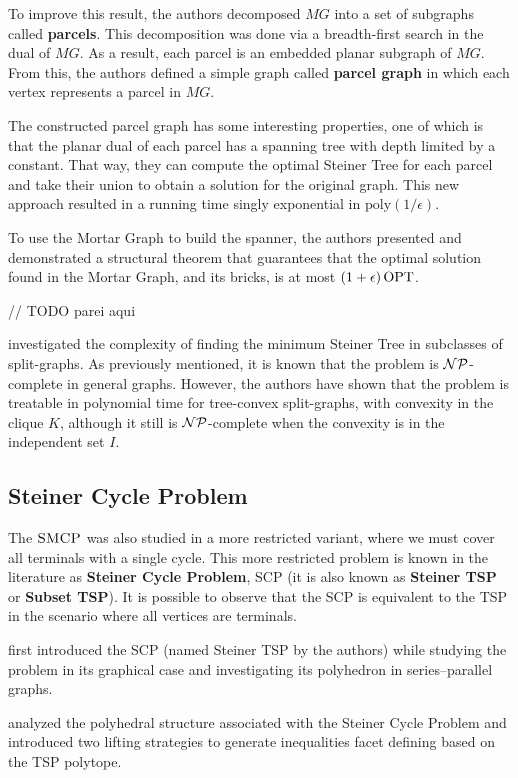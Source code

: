 To improve this result, the authors decomposed \(MG\) into a set of subgraphs called \textbf{parcels}. This decomposition was done via a breadth-first search in the dual of \(MG\). As a result, each parcel is an embedded planar subgraph of \(MG\). From this, the authors defined a simple graph called \textbf{parcel graph} in which each vertex represents a parcel in \(MG\).

The constructed parcel graph has some interesting properties, one of which is that the planar dual of each parcel has a spanning tree with depth limited by a constant. That way, they can compute the optimal Steiner Tree for each parcel and take their union to obtain a solution for the original graph. This new approach resulted in a running time singly exponential in \(\mathrm{poly}(1 / \epsilon)\).

To use the Mortar Graph to build the spanner, the authors presented and demonstrated a structural theorem that guarantees that the optimal solution found in the Mortar Graph, and its bricks, is at most \((1 + \epsilon) \operatorname{\textrm{OPT}}\).

// TODO parei aqui

\cite{split-graphs} investigated the complexity of finding the minimum Steiner Tree in subclasses of split-graphs. As previously mentioned, it is known that the problem is \(\mathcal{NP}\)-complete in general graphs. However, the authors have shown that the problem is treatable in polynomial time for tree-convex split-graphs, with convexity in the clique \(K\), although it still is \(\mathcal{NP}\)-complete when the convexity is in the independent set \(I\).


\subsection{Steiner Cycle Problem}

The \(\textsc{SMCP}\) was also studied in a more restricted variant, where we must cover all terminals with a single cycle. This more restricted problem is known in the literature as \textbf{Steiner Cycle Problem}, SCP (it is also known as \textbf{Steiner TSP} or \textbf{Subset TSP}). It is possible to observe that the SCP is equivalent to the TSP in the scenario where all vertices are terminals.

\cite{Cornuejols1985} first introduced the SCP (named Steiner TSP by the authors) while studying the problem in its graphical case and investigating its polyhedron in series–parallel graphs.

\cite{SalazarSteinerCycle} analyzed the polyhedral structure associated with the Steiner Cycle Problem and introduced two lifting strategies to generate inequalities facet defining based on the TSP polytope.

